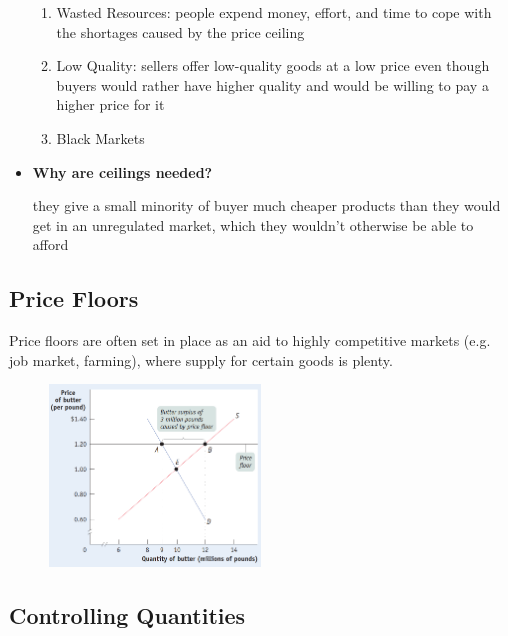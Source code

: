 \documentclass[english,course]{Notes}
\begin{document}
\begin{itemize}
\begin{enumerate}
	\item Wasted Resources: people expend money, effort, and time to cope with the shortages caused by the price ceiling
	
	\item Low Quality: sellers offer low-quality goods at a low price even though buyers would rather have higher quality and would be willing to pay a higher price for it
	
	\item Black Markets
	
	\end{enumerate}
	
	\item \textbf{Why are ceilings needed?} \par{they give a small minority
of buyer much cheaper products than they would get in an unregulated market, which they wouldn't otherwise be able to afford}

\end{itemize}

\subsection{Price Floors}



\par{Price floors are often set in place as an aid to highly competitive  markets (e.g. job market, farming), where supply for certain goods is plenty.}

\begin{figure}[h]
\centering
\includegraphics[width=0.5\textwidth]{floor}
\end{figure}



\subsection{Controlling Quantities}



\newpage
\nocite{*}
\printbibliography
\end{document}
